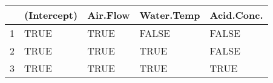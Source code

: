 \begin{table}[ht]
\centering
\begin{tabular}{rllll}
  \hline
 & (Intercept) & Air.Flow & Water.Temp & Acid.Conc. \\ 
  \hline
1 & TRUE & TRUE & FALSE & FALSE \\ 
  2 & TRUE & TRUE & TRUE & FALSE \\ 
  3 & TRUE & TRUE & TRUE & TRUE \\ 
   \hline
\end{tabular}
\end{table}
